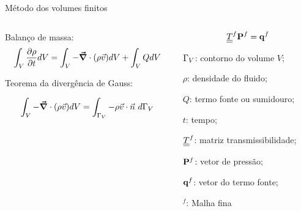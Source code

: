 \documentclass[professionalfont]{beamer}
\begin{document}
\begin{frame}{Método dos volumes finitos}

\begin{columns}
\begin{column}{0.6\textwidth}
Balanço de massa:
  \begin{equation}
	\label{eq:volumes_finitos.1}
	\int_{V} \frac{\partial \rho}{\partial t} dV = \int_{V} - \mbox{\boldmath$ \vec{\nabla} $} \cdot (\rho \vec{v}) dV + \int_{V} Q dV
\end{equation}


Teorema da divergência de Gauss:

 \begin{equation}
	 \label{eq:volumes_finitos.2}
	 \int_{V} - \mbox{\boldmath$ \vec{\nabla} $} \cdot (\rho \vec{v}) dV = \int_{\Gamma_{V}} - \rho \vec{v} \cdot \vec{n} \text{ } d \Gamma_{V}
 \end{equation}

\end{column}
\begin{column}{0.4\textwidth}  %
    \begin{equation}
        \underline{\underline{T}}^{f} \mathbf{P}^{f} = \mathbf{q}^{f}
    \end{equation}

    \begin{description}[]
        \small
        \item $\Gamma_{V}$: contorno do volume $V$;
        \item $\rho$: densidade do fluido;
        \item $Q$: termo fonte ou sumidouro;
        \item $t$: tempo;
        \item $\underline{\underline{T}}^{f}$: matriz transmissibilidade;
        \item $\mathbf{P}^{f}$: vetor de pressão;
        \item $\mathbf{q}^{f}$: vetor do termo fonte;
        \item $^{f}$: Malha fina
    \end{description}
    
\end{column}
\end{columns}

\end{frame}
\end{document}
